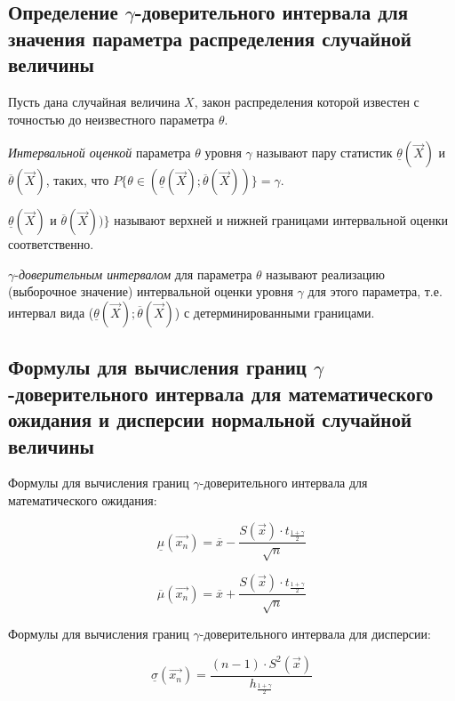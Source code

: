 \documentclass[12pt]{report}
\begin{document}
\subsection*{Определение $\gamma$-доверительного интервала для значения параметра распределения случайной величины}

Пусть дана случайная величина $X$, закон распределения которой известен с точностью до неизвестного параметра $\theta$.

\textit{Интервальной оценкой} параметра $\theta$ уровня $\gamma$ называют пару статистик $\underline{\theta}(\vec X)$ и $\overline{\theta}(\vec X)$, таких, что $P\{\theta \in (\underline{\theta}(\vec X); \overline{\theta}(\vec X))\} = \gamma.$

$\underline{\theta}(\vec X)$ и $\overline{\theta}(\vec X))\}$ называют верхней и нижней границами интервальной оценки соответственно.

$\gamma$-\textit{доверительным интервалом} для параметра $\theta$ называют реализацию (выборочное значение) интервальной оценки уровня $\gamma$ для этого параметра, т.е. интервал вида ($\underline{\theta}(\vec X); \overline{\theta}(\vec X)$) с детерминированными границами.

\subsection*{Формулы для вычисления границ $\gamma$-доверительного интервала для математического ожидания и дисперсии нормальной случайной величины}

Формулы для вычисления границ $\gamma$-доверительного интервала для математического ожидания:

\begin{equation*}
	\underline{\mu}(\vec{x_n}) = \overline{x} - \frac{S(\vec{x})\cdot t_{\frac{1+\gamma}{2}}}{\sqrt{n}} 
\end{equation*}

\begin{equation*}
	\overline{\mu}(\vec{x_n}) = \overline{x} + \frac{S(\vec{x})\cdot t_{\frac{1+\gamma}{2}}}{\sqrt{n}} 
\end{equation*}

Формулы для вычисления границ $\gamma$-доверительного интервала для дисперсии:

\begin{equation*}
	\underline{\sigma}(\vec{x_n}) = \frac{(n - 1) \cdot S^2(\vec{x})}{h_\frac{1+\gamma}{2}}
\end{equation*}
\end{document}
